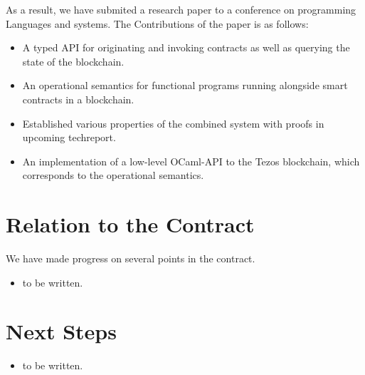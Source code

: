 \documentclass[a4paper,11pt]{article}
\begin{document}
\begin{itemize}
As a result, we have submited a research paper to a conference on programming Languages and systems. The   
Contributions of the paper is as follows:
\begin{itemize}
\item A typed API for originating and invoking contracts as well as querying the
state of the blockchain.
\item An operational semantics for functional programs running alongside smart
contracts in a blockchain.
\item Established various properties of the combined system with proofs in upcoming techreport.
\item An implementation of a low-level OCaml-API to the Tezos blockchain, which corresponds to the operational semantics. 
\end{itemize}


\end{itemize}

\section{Relation to the Contract}
\label{sec:relation-contract}

We have made progress on several points in the contract.
\begin{itemize}
\item to be written.
\end{itemize}

\section{Next Steps}

\begin{itemize}
\item  to be written.
\end{itemize}




\end{document}
